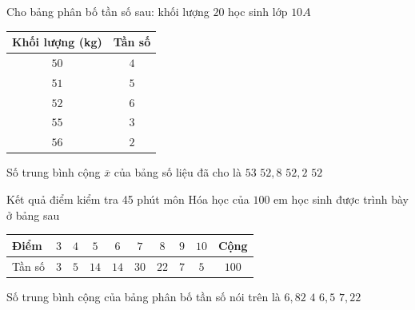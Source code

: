 \begin{ex}%
	Cho bảng phân bố tần số sau: khối lượng  $20$ học sinh lớp $10A$
	\begin{center}
		\begin{tabular}{|c|c|}
			\hline Khối lượng (kg) & Tần số\\ 
			\hline $50$ & $4$\\ 
			\hline $51$  & $5$\\
			\hline  $52$ & $6$\\
			\hline $55$  & $3$\\
			\hline $56$  & $2$\\
			\hline 
		\end{tabular}
	\end{center}
	Số trung bình cộng $\overline {x}$ của bảng  số liệu đã cho là
	\choice 
		{$53$} 
		 {$52{,}8$}
		{\True  $52{,}2$}
		{$52$} 
\end{ex}

\begin{ex}%
	Kết quả điểm kiểm tra 45 phút môn Hóa học của $100$ em học sinh được trình  bày ở bảng sau
	\begin{center}
		\begin{tabular}{|l|c|c|c|c|c|c|c|c|c|}
			\hline Điểm & $3$ & $4$ & $5$ & $6$ & $7$ & $8$ & $9$ &  $10$ & Cộng\\
			\hline Tần số & $3$ & $5$  & $14$ & $14$ & $30$ & $22$ & $7$ & $5$ & $100$\\
			 \hline
		\end{tabular}
	\end{center}
	Số trung bình cộng của bảng phân bố tần  số nói trên là
	 \choice
		 {\True $6{,}82$}
		{$4$} 
		{$6{,}5$} 
		 {$7{,}22$}
\end{ex}

